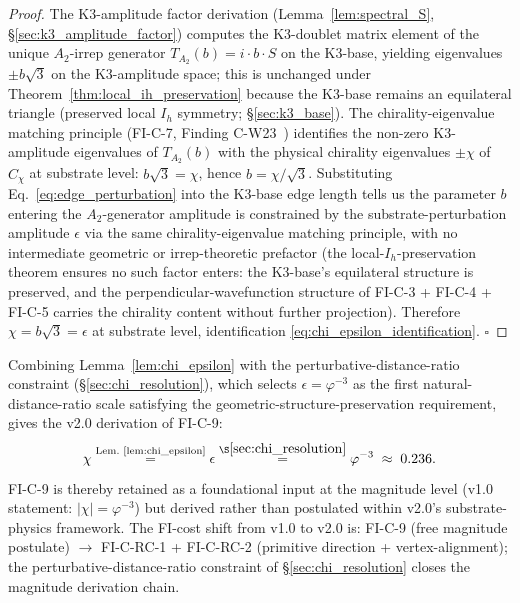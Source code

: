 \documentclass[11pt,letterpaper]{article}
\newcommand{\phig}{\varphi}
\newcommand{\Cchi}{\hat{C}_\chi}
\begin{document}
\begin{proof}
The K3-amplitude factor derivation (Lemma~\ref{lem:spectral_S}, \S\ref{sec:k3_amplitude_factor}) computes the K3-doublet matrix element of the unique $A_2$-irrep generator $T_{A_2}(b) = i \cdot b \cdot S$ on the K3-base, yielding eigenvalues $\pm b\sqrt{3}$ on the K3-amplitude space; this is unchanged under Theorem~\ref{thm:local_ih_preservation} because the K3-base remains an equilateral triangle (preserved local $I_h$ symmetry; \S\ref{sec:k3_base}). The chirality-eigenvalue matching principle (FI-C-7, Finding C-W23~\cite{abshier_capotauro_subclaim_c_sketch}) identifies the non-zero K3-amplitude eigenvalues of $T_{A_2}(b)$ with the physical chirality eigenvalues $\pm\chi$ of $\Cchi$ at substrate level: $b\sqrt{3} = \chi$, hence $b = \chi/\sqrt{3}$. Substituting Eq.~\eqref{eq:edge_perturbation} into the K3-base edge length tells us the parameter $b$ entering the $A_2$-generator amplitude is constrained by the substrate-perturbation amplitude $\epsilon$ via the same chirality-eigenvalue matching principle, with no intermediate geometric or irrep-theoretic prefactor (the local-$I_h$-preservation theorem ensures no such factor enters: the K3-base's equilateral structure is preserved, and the perpendicular-wavefunction structure of FI-C-3 + FI-C-4 + FI-C-5 carries the chirality content without further projection). Therefore $\chi = b\sqrt{3} = \epsilon$ at substrate level, identification \eqref{eq:chi_epsilon_identification}.
$\square$
\end{proof}

Combining Lemma~\ref{lem:chi_epsilon} with the perturbative-distance-ratio constraint (\S\ref{sec:chi_resolution}), which selects $\epsilon = \phig^{-3}$ as the first natural-distance-ratio scale satisfying the geometric-structure-preservation requirement, gives the v2.0 derivation of FI-C-9:
\begin{equation}\label{eq:chi_v2_derivation_chain}
\chi \stackrel{\text{Lem.~\ref{lem:chi_epsilon}}}{=} \epsilon \stackrel{\S\ref{sec:chi_resolution}}{=} \phig^{-3} \;\approx\; 0.236.
\end{equation}
FI-C-9 is thereby retained as a foundational input at the magnitude level (v1.0 statement: $|\chi| = \phig^{-3}$) but derived rather than postulated within v2.0's substrate-physics framework. The FI-cost shift from v1.0 to v2.0 is: FI-C-9 (free magnitude postulate) $\to$ FI-C-RC-1 + FI-C-RC-2 (primitive direction + vertex-alignment); the perturbative-distance-ratio constraint of \S\ref{sec:chi_resolution} closes the magnitude derivation chain.
\end{document}
